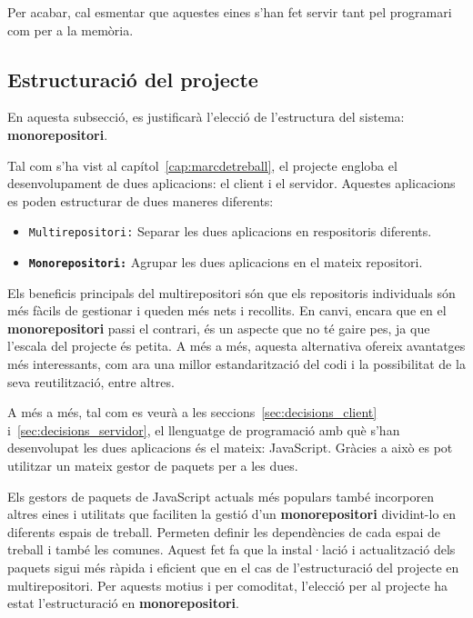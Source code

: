 \documentclass[a4paper,12pt]{ThesisStyle}
\begin{document}
Per acabar, cal esmentar que aquestes eines s'han fet servir tant pel programari com per a la memòria.

\subsection{Estructuració del projecte}
\label{subsec:decisions_estructura_estructura}

En aquesta subsecció, es justificarà l'elecció de l'estructura del sistema: \textbf{monorepositori}.

Tal com s'ha vist al capítol~\ref{cap:marcdetreball}, el projecte engloba el desenvolupament de dues aplicacions: el client i el servidor. Aquestes aplicacions es poden estructurar de dues maneres diferents:
\begin{itemize}
  \item \texttt{Multirepositori:} Separar les dues aplicacions en respositoris diferents. 
  \item \texttt{\textbf{Monorepositori:}} Agrupar les dues aplicacions en el mateix repositori.
\end{itemize}

Els beneficis principals del multirepositori són que els repositoris individuals són més fàcils de gestionar i queden més nets i recollits. En canvi, encara que en el \textbf{monorepositori} passi el contrari, és un aspecte que no té gaire pes, ja que l'escala del projecte és petita. A més a més, aquesta alternativa ofereix avantatges més interessants, com ara una millor estandarització del codi i la possibilitat de la seva reutilització, entre altres.

A més a més, tal com es veurà a les seccions~\ref{sec:decisions_client} i~\ref{sec:decisions_servidor}, el llenguatge de programació amb què s'han desenvolupat les dues aplicacions és el mateix: JavaScript. Gràcies a això es pot utilitzar un mateix gestor de paquets per a les dues.

Els gestors de paquets de JavaScript actuals més populars també incorporen altres eines i utilitats que faciliten la gestió d'un \textbf{monorepositori} dividint-lo en diferents espais de treball. Permeten definir les dependències de cada espai de treball i també les comunes. Aquest fet fa que la instal·lació i actualització dels paquets sigui més ràpida i eficient que en el cas de l'estructuració del projecte en multirepositori. Per aquests motius i per comoditat, l'elecció per al projecte ha estat l'estructuració en \textbf{monorepositori}.
\end{document}
